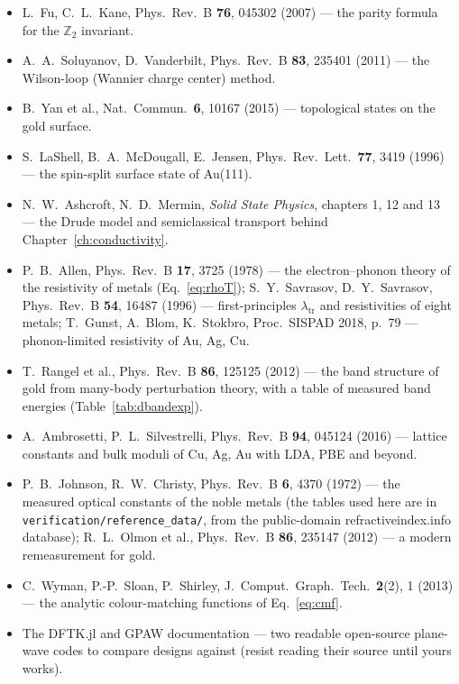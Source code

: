 \begin{itemize}[leftmargin=2em]
(CUP, 2018) --- the book-length version of Chapter~\ref{ch:topology}.
\item L.\ Fu, C.\ L.\ Kane, Phys.\ Rev.\ B \textbf{76}, 045302 (2007) ---
the parity formula for the $\mathbb{Z}_2$ invariant.
\item A.\ A.\ Soluyanov, D.\ Vanderbilt, Phys.\ Rev.\ B \textbf{83}, 235401
(2011) --- the Wilson-loop (Wannier charge center) method.
\item B.\ Yan et al., Nat.\ Commun.\ \textbf{6}, 10167 (2015) ---
topological states on the gold surface.
\item S.\ LaShell, B.\ A.\ McDougall, E.\ Jensen, Phys.\ Rev.\ Lett.\
\textbf{77}, 3419 (1996) --- the spin-split surface state of Au(111).
\item N.\ W.\ Ashcroft, N.\ D.\ Mermin, \emph{Solid State Physics},
chapters 1, 12 and 13 --- the Drude model and semiclassical transport
behind Chapter~\ref{ch:conductivity}.
\item P.\ B.\ Allen, Phys.\ Rev.\ B \textbf{17}, 3725 (1978) --- the
electron--phonon theory of the resistivity of metals
(Eq.~\eqref{eq:rhoT}); S.\ Y.\ Savrasov, D.\ Y.\ Savrasov, Phys.\ Rev.\ B
\textbf{54}, 16487 (1996) --- first-principles $\lambda_{\mathrm{tr}}$
and resistivities of eight metals; T.\ Gunst, A.\ Blom, K.\ Stokbro,
Proc.\ SISPAD 2018, p.~79 --- phonon-limited resistivity of Au, Ag, Cu.
\item T.\ Rangel et al., Phys.\ Rev.\ B \textbf{86}, 125125 (2012) ---
the band structure of gold from many-body perturbation theory, with a
table of measured band energies (Table~\ref{tab:dbandexp}).
\item A.\ Ambrosetti, P.\ L.\ Silvestrelli, Phys.\ Rev.\ B \textbf{94},
045124 (2016) --- lattice constants and bulk moduli of Cu, Ag, Au with
LDA, PBE and beyond.
\item P.\ B.\ Johnson, R.\ W.\ Christy, Phys.\ Rev.\ B \textbf{6}, 4370
(1972) --- the measured optical constants of the noble metals (the
tables used here are in \texttt{verification/reference\_data/}, from
the public-domain refractiveindex.info database); R.\ L.\ Olmon et al.,
Phys.\ Rev.\ B \textbf{86}, 235147 (2012) --- a modern remeasurement
for gold.
\item C.\ Wyman, P.-P.\ Sloan, P.\ Shirley, J.\ Comput.\ Graph.\ Tech.\
\textbf{2}(2), 1 (2013) --- the analytic colour-matching functions of
Eq.~\eqref{eq:cmf}.
\item The DFTK.jl and GPAW documentation --- two readable open-source
plane-wave codes to compare designs against (resist reading their source
until yours works).
\end{itemize}

